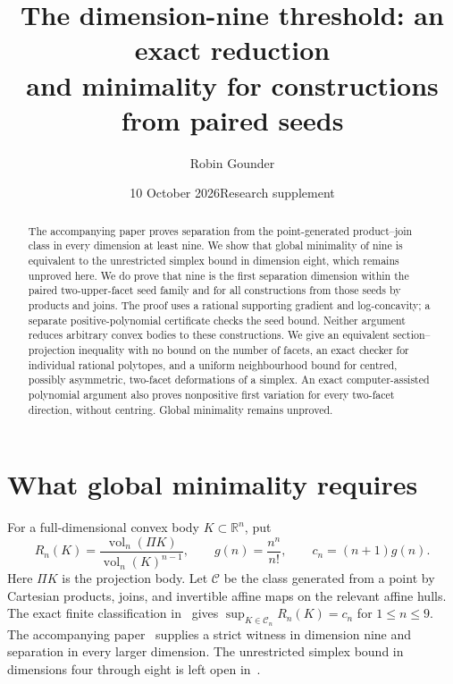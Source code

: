 \documentclass[11pt,a4paper]{article}
\title{The dimension-nine threshold: an exact reduction\texorpdfstring{\\}{ }and minimality for constructions from paired seeds}
\author{Robin Gounder}
\date{10 October 2026\quad Research supplement}
\newcommand{\vol}{\operatorname{vol}}
\newcommand{\CC}{\mathcal C}
\begin{document}
\maketitle
\begin{abstract}
The accompanying paper proves separation from the point-generated
product--join class in every dimension at least nine. We show that global
minimality of nine is equivalent to the unrestricted simplex bound in
dimension eight, which remains unproved here. We do prove that nine is
the first separation dimension within the paired two-upper-facet seed
family and for all constructions from those seeds by products and joins.
The proof uses a rational supporting gradient and log-concavity; a
separate positive-polynomial certificate checks the seed bound. Neither
argument reduces arbitrary convex bodies to these constructions. We give
an equivalent section--projection inequality with no bound on the number
of facets, an exact checker for individual rational polytopes, and a
uniform neighbourhood bound for centred, possibly asymmetric, two-facet
deformations of a simplex. An exact computer-assisted polynomial argument
also proves nonpositive first variation for every two-facet direction,
without centring. Global minimality remains unproved.
\end{abstract}

\section{What global minimality requires}
For a full-dimensional convex body $K\subset\mathbb R^n$, put
\[
 R_n(K)=\frac{\vol_n(\Pi K)}{\vol_n(K)^{n-1}},\qquad
 g(n)=\frac{n^n}{n!},\qquad c_n=(n+1)g(n).
\]
Here $\Pi K$ is the projection body. Let $\CC$ be the class generated
from a point by Cartesian products, joins, and invertible affine maps
on the relevant affine hulls.
The exact finite classification in~\cite{finite} gives
$\sup_{K\in\CC_n}R_n(K)=c_n$ for $1\le n\le9$.
The accompanying paper~\cite{paper} supplies a strict witness in dimension
nine and separation in every larger dimension. The unrestricted simplex
bound in dimensions four through eight is left open in~\cite[Introduction]{feng}.
\end{document}
